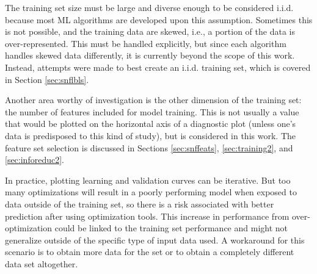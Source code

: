 The training set size must be large and diverse enough to be considered
\gls{i.i.d.} because most \gls{ML} algorithms are developed upon this
assumption. Sometimes this is not possible, and the training data are skewed,
i.e., a portion of the data is over-represented. This must be handled
explicitly, but since each algorithm handles skewed data differently, it is
currently beyond the scope of this work. Instead, attempts were made to best
create an \gls{i.i.d.} training set, which is covered in Section
\ref{sec:snflbls}.

Another area worthy of investigation is the other dimension of the training
set: the number of features included for model training. This is not usually a
value that would be plotted on the horizontal axis of a diagnostic plot (unless
one's data is predisposed to this kind of study), but is considered in this
work. The feature set selection is discussed in Sections \ref{sec:snffeats},
\ref{sec:training2}, and \ref{sec:inforeduc2}.

In practice, plotting learning and validation curves can be iterative. But too
many optimizations will result in a poorly performing model when exposed to
data outside of the training set, so there is a risk associated with better
prediction after using optimization tools.  This increase in performance from
over-optimization could be linked to the training set performance and might not
generalize outside of the specific type of input data used.  A workaround for
this scenario is to obtain more data for the set or to obtain a completely
different data set altogether. 

